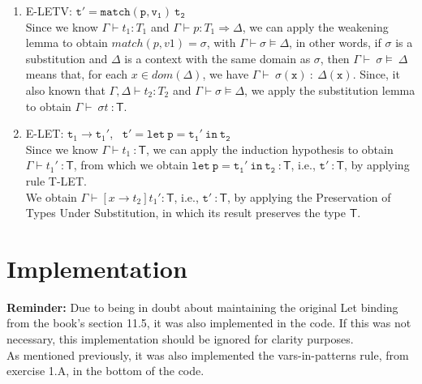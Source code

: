 \documentclass[a4paper]{article}
\begin{document}
\begin{enumerate}
\item E-LETV: $\mathtt{t' = match(p,v_1) \ t_2}$
\\Since we know $\Gamma\vdash t_1 : T_1$ and $\Gamma\vdash p : T_1 \Rightarrow \Delta$, we can apply the weakening lemma to obtain $match(p,v1) = \sigma$, with $\mathtt{\Gamma \vdash} \sigma \models \Delta$, in other words, if $\sigma$ is a substitution and $\Delta$ is a context with the same domain as $\sigma$, then $\mathtt{\Gamma \vdash \ \sigma \models} \ \Delta$ means that, for each $x \in dom(\Delta)$, we have $\mathtt{\Gamma \vdash \ \sigma(x)} ~\mathsf{:}\ \Delta\mathtt{(x)}$. Since, it also known that $\Gamma, \Delta \vdash t_2 : T_2$ and $\mathtt{\Gamma \vdash} \sigma \models \Delta$, we apply the substitution lemma to obtain $\mathtt{\Gamma \vdash} \ \sigma t ~\mathsf{:T}$.
\item E-LET: $\mathtt t_1 \rightarrow \mathtt t_1'$, \ $\mathtt{t' = let \ p = t_1' \ in \ t_2}$
\\Since we know $\Gamma\vdash t_1 ~\mathsf{:T}$, we can apply the induction hypothesis to obtain $\Gamma\vdash t_1' ~\mathsf{:T}$, from which we obtain $\mathtt{let \ p = t_1' \ in \ t_2}~\mathsf {:T}$, i.e., $\mathtt{t'}~\mathsf{:T}$, by applying rule T-LET.
\\
We obtain $\Gamma\vdash[x \rightarrow t_2] t_1' \mathsf{:T}$, i.e., $\mathtt{t'}~\mathsf{:T}$, by applying the Preservation of Types Under Substitution, in which its result preserves the type $\mathsf{T}$.
\end{enumerate}

\section{Implementation}
\textbf{Reminder:} Due to being in doubt about maintaining the original Let binding from the book's section 11.5, it was also implemented in the code. If this was not necessary, this implementation should be ignored for clarity purposes.\\
As mentioned previously, it was also implemented the vars-in-patterns rule, from exercise 1.A, in the bottom of the code.
\end{document}
